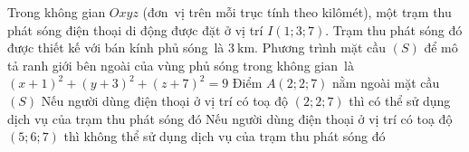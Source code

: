 \begin{ex}%
	Trong không gian $Oxyz$ (đơn~vị trên mỗi trục tính theo kilômét), một trạm thu  phát sóng điện thoại di động được đặt ở vị trí $I(1;3;7)$. Trạm thu phát sóng đó được thiết kế với bán kính phủ sóng~là $3 \mathrm{~km}$.
	 \choiceTF
		{Phương trình mặt cầu $(S)$ để mô tả  ranh giới bên ngoài của vùng phủ sóng trong không gian~là $(x+1)^2+(y+3)^2+(z+7)^2=9$}
		 {Điểm $A(2;2;7)$ nằm ngoài mặt cầu $(S)$}
		{\True Nếu người  dùng điện thoại ở vị trí có toạ độ $(2;2;7)$ thì có thể sử dụng dịch vụ của trạm thu phát sóng đó}
		{\True Nếu người dùng điện thoại ở vị trí có toạ độ $(5;6;7)$ thì không thể sử dụng dịch vụ của  trạm thu phát sóng đó}
\end{ex}

